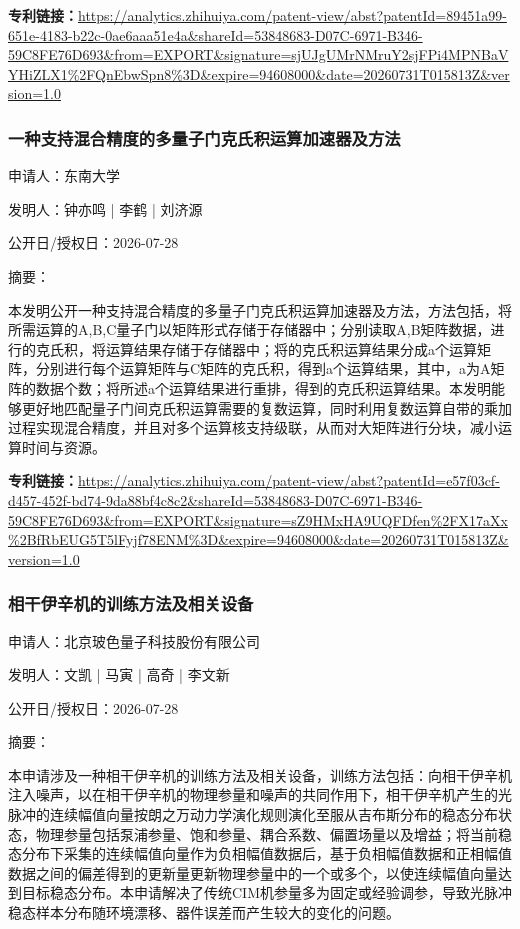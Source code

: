 \documentclass[12pt,a4paper]{ctexart}
\begin{document}
\noindent\textbf{专利链接：}\url{https://analytics.zhihuiya.com/patent-view/abst?patentId=89451a99-651e-4183-b22c-0ae6aaa51e4a&shareId=53848683-D07C-6971-B346-59C8FE76D693&from=EXPORT&signature=sjUJgUMrNMruY2sjFPi4MPNBaVYHiZLX1%2FQnEbwSpn8%3D&expire=94608000&date=20260731T015813Z&version=1.0}

\subsubsection{ 一种支持混合精度的多量子门克氏积运算加速器及方法 }

申请人：东南大学

发明人：钟亦鸣 | 李鹤 | 刘济源

公开日/授权日：2026-07-28

摘要：

本发明公开一种支持混合精度的多量子门克氏积运算加速器及方法，方法包括，将所需运算的A,B,C量子门以矩阵形式存储于存储器中；分别读取A,B矩阵数据，进行的克氏积，将运算结果存储于存储器中；将的克氏积运算结果分成a个运算矩阵，分别进行每个运算矩阵与C矩阵的克氏积，得到a个运算结果，其中，a为A矩阵的数据个数；将所述a个运算结果进行重排，得到的克氏积运算结果。本发明能够更好地匹配量子门间克氏积运算需要的复数运算，同时利用复数运算自带的乘加过程实现混合精度，并且对多个运算核支持级联，从而对大矩阵进行分块，减小运算时间与资源。

\noindent\textbf{专利链接：}\url{https://analytics.zhihuiya.com/patent-view/abst?patentId=e57f03cf-d457-452f-bd74-9da88bf4c8c2&shareId=53848683-D07C-6971-B346-59C8FE76D693&from=EXPORT&signature=sZ9HMxHA9UQFDfen%2FX17aXx%2BfRbEUG5T5lFyjf78ENM%3D&expire=94608000&date=20260731T015813Z&version=1.0}

\subsubsection{ 相干伊辛机的训练方法及相关设备 }

申请人：北京玻色量子科技股份有限公司

发明人：文凯 | 马寅 | 高奇 | 李文新

公开日/授权日：2026-07-28

摘要：

本申请涉及一种相干伊辛机的训练方法及相关设备，训练方法包括：向相干伊辛机注入噪声，以在相干伊辛机的物理参量和噪声的共同作用下，相干伊辛机产生的光脉冲的连续幅值向量按朗之万动力学演化规则演化至服从吉布斯分布的稳态分布状态，物理参量包括泵浦参量、饱和参量、耦合系数、偏置场量以及增益；将当前稳态分布下采集的连续幅值向量作为负相幅值数据后，基于负相幅值数据和正相幅值数据之间的偏差得到的更新量更新物理参量中的一个或多个，以使连续幅值向量达到目标稳态分布。本申请解决了传统CIM机参量多为固定或经验调参，导致光脉冲稳态样本分布随环境漂移、器件误差而产生较大的变化的问题。
\end{document}
